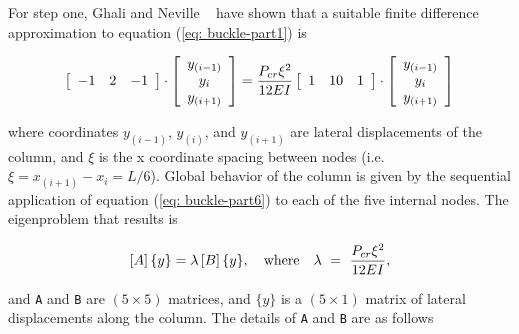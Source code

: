 \vspace{0.15 in}
\noindent\hspace{0.5 in}
For step one, Ghali and Neville ~\cite{ghali79} have shown that a suitable finite
difference approximation to equation (\ref{eq: buckle-part1}) is

\begin{equation}
\left[ \begin{array}{ccc}
-1 & 2 & -1 \\
\end{array} \right]
\cdot \left[ \begin{array}{c}
y_{(i-1)} \\ y_i \\ y_{(i+1)} \\
\end{array} \right]
= {{P_{cr} \xi^2} \over {12EI}}
\left[ \begin{array}{ccc}
1 & 10 & 1 \\
\end{array} \right]
\cdot \left[ \begin{array}{c}
y_{(i-1)} \\ y_i \\ y_{(i+1)} \\
\end{array} \right]
\label{eq: buckle-part6}
\end{equation}

\vspace{0.10 in}\noindent
where coordinates $y_{(i-1)}$, $y_{(i)}$, and $y_{(i+1)}$ are
lateral displacements of the column,
and $\xi$ is the x coordinate spacing between nodes (i.e. ${\xi = x_{(i+1)} - x_i} = L/6$).
Global behavior of the column is given by the sequential application of
equation (\ref{eq: buckle-part6}) to each of the five internal nodes.
The eigenproblem that results is

\begin{equation}
\left[ A \right] \lbrace y \rbrace = \lambda
\left[ B \right] \lbrace y \rbrace,
~~~\hbox{where}~~~
\lambda ~=~ {{P_{cr} \xi^2} \over {12EI}},
\label{eq: buckle-part7}
\end{equation}

\vspace{0.10 in}\noindent
and {\tt A} and {\tt B} are $(5 \times 5)$ matrices,
and $\lbrace y \rbrace$ is a $(5 \times 1)$
matrix of lateral displacements along the column.
The details of {\tt A} and {\tt B} are as follows

